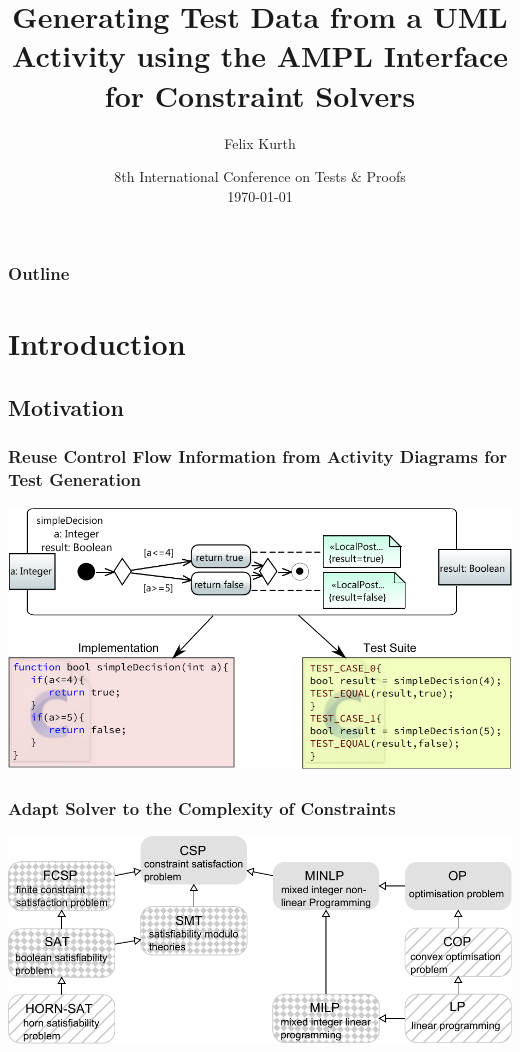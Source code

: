 \documentclass{beamer}
\title[Automated Generation of Test Data using AMPL]{Generating Test Data from a UML Activity using the AMPL Interface for Constraint Solvers}
\author[F. Kurth]{Felix Kurth}
\institute[sts.tuhh.de]
{
Institute for Software Systems\\
Hamburg University of Technology
}
\date[TAP2014]{8th International Conference on Tests \& Proofs\\
\today
}
\begin{document}
\begin{frame}
\titlepage
\end{frame}

\begin{frame}
\frametitle{Outline}
\tableofcontents
\end{frame}

\section{Introduction}
\subsection{Motivation}


\begin{frame}
\frametitle{Reuse Control Flow Information from Activity Diagrams for Test Generation}
\includegraphics[width=\textwidth]{../Thesis/pics/BasicExamplesSimpleDecision.pdf}
\end{frame}

\begin{frame}
\frametitle{Adapt Solver to the Complexity of Constraints}
\includegraphics[width=\textwidth]{../Thesis/pics/ProblemLatice.pdf}
\end{frame}
\end{document}
